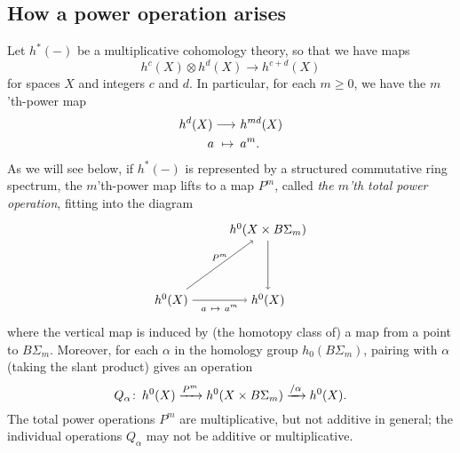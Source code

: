 \documentclass{gtpart}
\theoremstyle{definition}
\theoremstyle{remark}
\def\co{\colon\thinspace}
\newcommand{\A}{\alpha}
\numberwithin{equation}{section}
\numberwithin{thm}{section}
\begin{document}
\subsection{How a power operation arises}
\label{subsec:arise}

Let $h^*(-)$ be a multiplicative cohomology theory, so that we have maps 
\[
 h^c(X) \otimes h^d(X) \longrightarrow h^{c+d}(X) 
\]
for spaces $X$ and integers $c$ and $d$.  In particular, for each 
$m \geq 0$, we have the $m$'th-power map 
\begin{equation*}
\begin{split}
 h^d(X) \longrightarrow & ~ h^{md}(X) \\
 a ~ \mapsto \thinspace & ~ a^m.  
\end{split}
\end{equation*}
As we will see below, if $h^*(-)$ is represented by a structured 
commutative ring spectrum, the $m$'th-power map lifts to a map $P^m$, 
called {\em the $m$'th total power operation}, fitting into the diagram 
\begin{equation}
\label{relFrob1}
 \begin{tikzpicture}[baseline=(current bounding box.center)]
         \node (RT) at (4.65, 2) {$h^0(X \times B\Sigma_m)$}; 
         \node (LB) at (1.9, 0) {$h^0(X)$}; 
         \node (RB) at (4.65, 0) {$h^0(X)$}; 
         \draw [->] (LB) -- node [above] {$\scriptstyle P^m$} (RT); 
         \draw [->] (LB) -- node [below] {$\scriptstyle a ~ \mapsto ~ a^m$} (RB); 
         \draw [->] (RT) -- (RB); 
 \end{tikzpicture}
\end{equation}
where the vertical map is induced by (the homotopy class of) a map from 
a point to $B\Sigma_m$.  Moreover, for each $\A$ in the homology group 
$h_0(B\Sigma_m)$, pairing with $\A$ (taking the slant product) gives an 
operation 
\[
 Q_\A \co h^0(X) \xrightarrow{P^m} h^0(X \times B\Sigma_m) 
 \xrightarrow{/\A} h^0(X).  
\]
The total power operations $P^m$ are multiplicative, but not additive in 
general; the individual operations $Q_\A$ may not be additive or 
multiplicative.  
\end{document}
